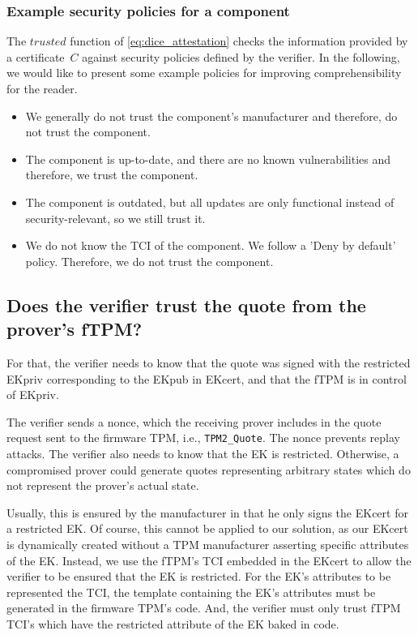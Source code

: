 \subsubsection{Example security policies for a component}

The $trusted$ function of \autoref{eq:dice_attestation} checks the information provided by a certificate~$C$ against security policies defined by the verifier.
In the following, we would like to present some example policies for improving comprehensibility for the reader.

\begin{itemize}
    \item We generally do not trust the component's manufacturer and therefore, do not trust the component.
    \item The component is up-to-date, and there are no known vulnerabilities and therefore, we trust the component.
    \item The component is outdated, but all updates are only functional instead of security-relevant, so we still trust it.
    \item We do not know the TCI of the component. We follow a 'Deny by default' policy. Therefore, we do not trust the component.
\end{itemize}

\subsection{Does the verifier trust the quote from the prover's fTPM?}

For that, the verifier needs to know that the quote was signed with the restricted EKpriv corresponding to the EKpub in EKcert, and that the fTPM is in control of EKpriv.

The verifier sends a nonce, which the receiving prover includes in the quote request sent to the firmware TPM, i.e., \texttt{TPM2\_Quote}.
The nonce prevents replay attacks.
The verifier also needs to know that the EK is restricted.
Otherwise, a compromised prover could generate quotes representing arbitrary states which do not represent the prover's actual state.

Usually, this is ensured by the manufacturer in that he only signs the EKcert for a restricted EK.
Of course, this cannot be applied to our solution, as our EKcert is dynamically created without a TPM manufacturer asserting specific attributes of the EK.
Instead, we use the fTPM's TCI embedded in the EKcert to allow the verifier to be ensured that the EK is restricted.
For the EK's attributes to be represented the TCI, the template containing the EK's attributes must be generated in the firmware TPM's code.
And, the verifier must only trust fTPM TCI's which have the restricted attribute of the EK baked in code.

